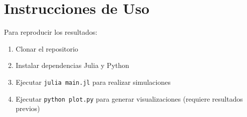 \documentclass[12pt, a4paper, spanish]{report}
\begin{document}
\section{Instrucciones de Uso}

Para reproducir los resultados:

\begin{enumerate}
    \item Clonar el repositorio
    \item Instalar dependencias Julia y Python
    \item Ejecutar \texttt{julia main.jl} para realizar simulaciones
    \item Ejecutar \texttt{python plot.py} para generar visualizaciones (requiere resultados previos)
\end{enumerate}
\end{document}

